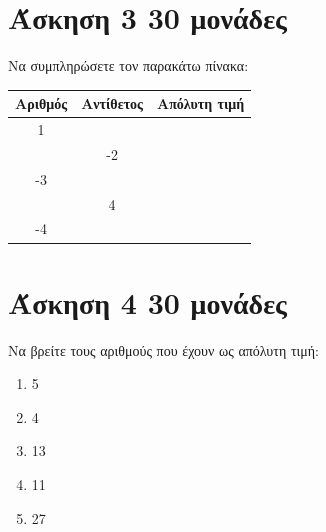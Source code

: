 \documentclass[a4paper,10pt]{report}
\begin{document}
\section*{Άσκηση 3  \hfill \small{30 μονάδες}}
Να συμπληρώσετε τον παρακάτω πίνακα:
\begin{center}
 \begin{tabular}{|c|c|c|}\hline 
\textbf{Αριθμός}         &   \textbf{Αντίθετος} & \textbf{Απόλυτη τιμή}      \\
\hline 
                                1       &        &   \\
\hline 
                                       &   -2     &   \\
\hline 
                              -3         &        &   \\
\hline 
                                       &    4    &   \\
\hline 
                                -4       &        &   \\
\hline 
\end{tabular}
\end{center}





\section*{Άσκηση 4  \hfill \small{30 μονάδες}}
Να βρείτε τους αριθμούς που έχουν ως απόλυτη τιμή: 
\begin{enumerate}[1)]
 \item 5
 \item 4
 \item 13
 \item 11
 \item 27
\end{enumerate}
\end{document}
